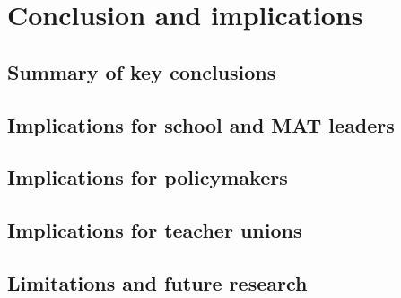 \chapter{Conclusion and implications}


\section{Summary of key conclusions}

\section{Implications for school and MAT leaders}

\section{Implications for policymakers}

\section{Implications for teacher unions}

\section{Limitations and future research}
